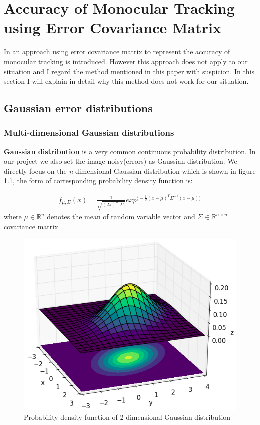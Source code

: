 \chapter{Accuracy of Monocular Tracking using Error Covariance Matrix}
\label{chap:Accuracy of Monocular Tracking using Error Covariance Matrix}

In \cite{bauer2007tracking}
an approach using error covariance matrix to represent the accuracy of monocular tracking is introduced. However this approach does not apply to our situation and I regard the method mentioned in this paper with suspicion. In this section I will explain in detail why this method does not work for our situation.

\section{Gaussian error distributions}

\subsection{Multi-dimensional Gaussian distributions}
\textbf{Gaussian distribution} is a very common continuous probability distribution. In our project we also set the image noisy(errors) as Gaussian distribution. We directly focus on the \textit{n}-dimensional Gaussian distribution which is shown in figure \ref{fig:gaussian}, the form of corresponding probability density function is:

\begin{align}\label{eq:cee1}
 f_{\mu,\Sigma}(x)= \frac{1}{\sqrt{( 2\pi)^n|\Sigma|}}exp^{\big(-\frac{1}{2}(x - \mu)^T \Sigma^{-1} (x - \mu) \big)}
\end{align}
where $\mu \in \mathbb{R}^n$ denotes the mean of random variable vector and $\Sigma \in \mathbb{R}^{n \times n}$ covariance matrix.

\begin{figure}[h!]
\centering
\includegraphics[scale=0.5]{./fig/gaussian.png}
\caption{Probability density function of 2 dimensional Gaussian distribution}  
\label{fig:gaussian}
\end{figure}

